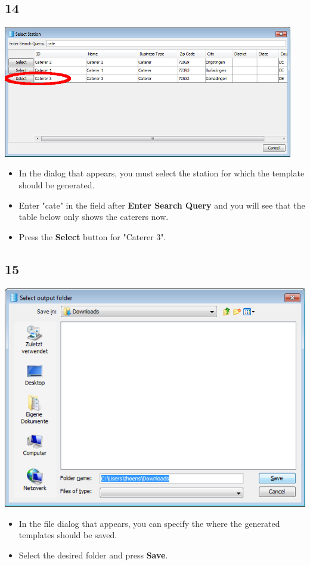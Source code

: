 \documentclass{beamer}
\begin{document}
\subsection{14}
\begin{frame}
	\begin{center}
  		\includegraphics[width=0.95\textwidth]{14.png}
	\end{center}
	\begin{itemize}
		\item In the dialog that appears, you must select the station for which the template should be generated.
		\item Enter "cate" in the field after \textbf{Enter Search Query} and you will see that the table below only shows the caterers now.
		\item Press the \textbf{Select} button for "Caterer 3".
	\end{itemize}
\end{frame}

\subsection{15}
\begin{frame}
	\begin{center}
  		\includegraphics[height=0.5\textheight]{15.png}
	\end{center}
	\begin{itemize}
		\item In the file dialog that appears, you can specify the where the generated templates should be saved.
		\item Select the desired folder and press \textbf{Save}.
	\end{itemize}
\end{frame}
\end{document}
